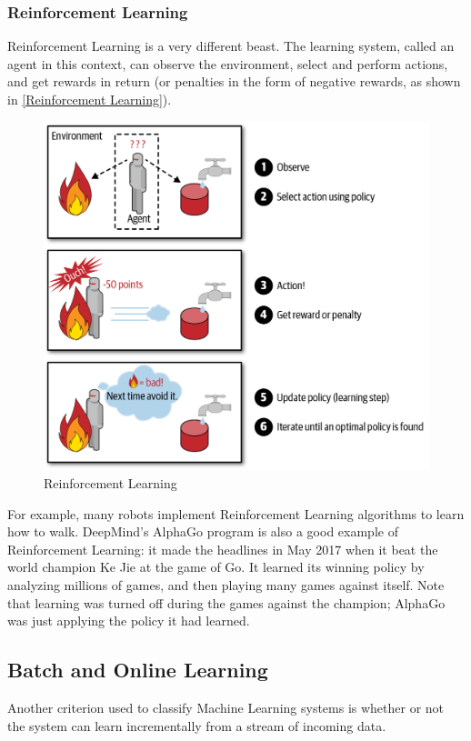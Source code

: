 \subsubsection{Reinforcement Learning}
Reinforcement Learning is a very different beast. The learning system, called an agent
in this context, can observe the environment, select and perform actions, and get
rewards in return (or penalties in the form of negative rewards, as shown in
\autoref{Reinforcement Learning}).
\begin{figure}
\centering
\includegraphics{img/Reinforcement Learning.png}
\caption{Reinforcement Learning}
\label{Reinforcement Learning}
\end{figure}
For example, many robots implement Reinforcement Learning algorithms to learn
how to walk. DeepMind’s AlphaGo program is also a good example of Reinforcement
Learning: it made the headlines in May 2017 when it beat the world champion Ke Jie
at the game of Go. It learned its winning policy by analyzing millions of games, and
then playing many games against itself. Note that learning was turned off during the
games against the champion; AlphaGo was just applying the policy it had learned.
\subsection{Batch and Online Learning}
Another criterion used to classify Machine Learning systems is whether or not the
system can learn incrementally from a stream of incoming data.

